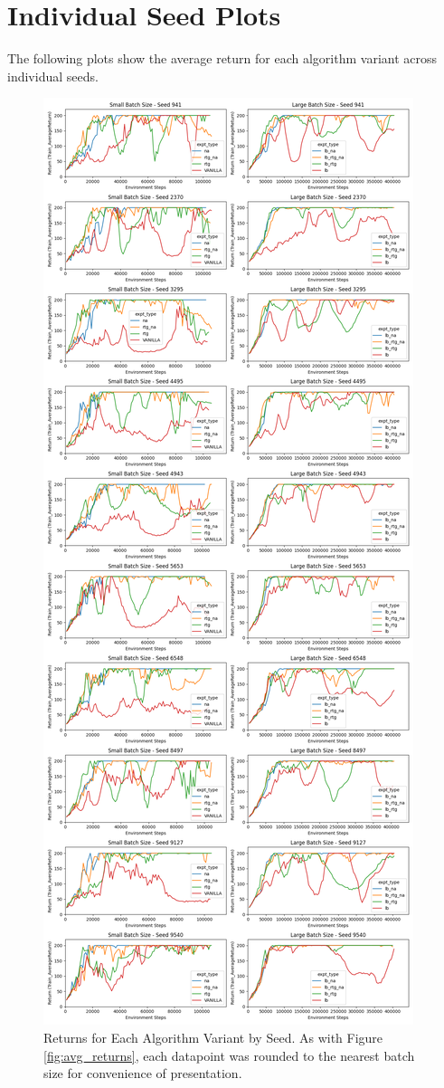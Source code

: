 \documentclass{article} %
\begin{document}
\newpage
\section{Individual Seed Plots} \label{sec:indiv_seed_plots}
The following plots show the average return for each algorithm variant across individual seeds.
\begin{figure}[h]
    \centering
    \captionsetup{justification=centering}
    \includegraphics[width = \linewidth, height = 0.85\textheight]{plots/return-vs-env-steps-seeds.png}
    \caption{Returns for Each Algorithm Variant by Seed. As with Figure \ref{fig:avg_returns},
    each datapoint was rounded to the nearest batch size for convenience of presentation.}
    \label{fig:returns_by_seed}
\end{figure}
\end{document}
